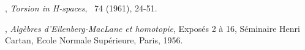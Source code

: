 

\begin{thebibliography}{99}













, \textit{Torsion in H-spaces}, \ANNMAone\ 74 (1961), 24-51.


, \textit{Alg\`ebres d'Eilenberg-MacLane et homotopie}, Expos\'es 2 \`a 16, S\'eminaire Henri Cartan, Ecole Normale Sup\'erieure, Paris, 1956. 


\end{thebibliography}
